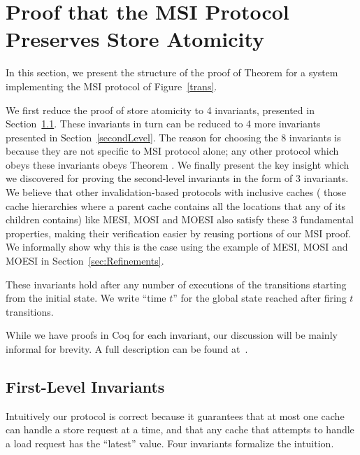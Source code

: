 \section{Proof that the MSI Protocol Preserves Store Atomicity}
\label{Sec:Safety}
\label{safety}

In this section, we present the structure of the proof of Theorem
 for a system implementing the MSI protocol of
Figure~\ref{trans}.

We first reduce the proof of store atomicity to 4 invariants, presented in
Section~\ref{firstLevel}. These invariants in turn can be reduced to 4 more
invariants presented in Section~\ref{secondLevel}. The reason for choosing the 8
 invariants is because they are not specific to MSI protocol
alone; any other protocol which obeys these invariants obeys Theorem
. We finally present the key insight which we
discovered for proving the second-level invariants in the form of 3 invariants.
We believe that other invalidation-based protocols with inclusive caches (\ie{}
those cache hierarchies where a parent cache contains all the locations that
any of its children contains) like MESI, MOSI and MOESI also
satisfy these 3 fundamental properties, making their verification easier by reusing
portions of our MSI proof.
We informally show why this is the case using the example of MESI,
MOSI and MOESI in Section~\ref{sec:Refinements}.


These invariants hold after any number of executions of the transitions starting
from the initial state. We write ``time $t$'' for the global state
reached after firing $t$ transitions.

While we have proofs in Coq for each invariant, our discussion will be mainly
informal for brevity. A full description can be found at~. 

\subsection{First-Level Invariants}
\label{firstLevel}
Intuitively our protocol is correct because it guarantees that at most one
cache can handle a store request at a time, and that any cache that attempts to
handle a load request has the ``latest'' value. Four invariants formalize
the intuition.

